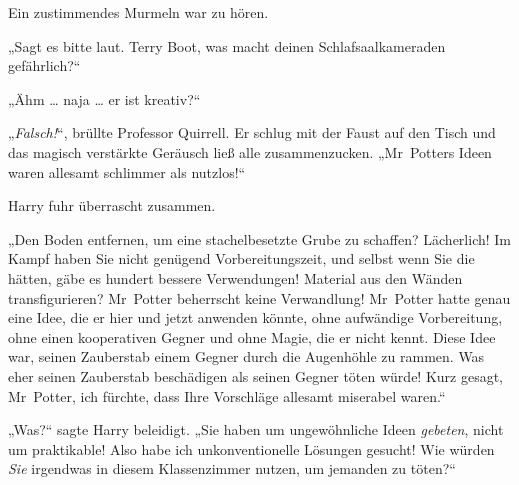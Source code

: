 Ein zustimmendes Murmeln war zu hören.

„Sagt es bitte laut. Terry Boot, was macht deinen Schlafsaalkameraden gefährlich?“

„Ähm … naja … er ist kreativ?“

„\emph{Falsch!}“, brüllte Professor Quirrell. Er schlug mit der Faust auf den Tisch und das magisch verstärkte Geräusch ließ alle zusammenzucken.
„Mr~Potters Ideen waren allesamt schlimmer als nutzlos!“

Harry fuhr überrascht zusammen.

„Den Boden entfernen, um eine stachelbesetzte Grube zu schaffen? Lächerlich! Im Kampf haben Sie nicht genügend Vorbereitungszeit, und selbst wenn Sie die hätten, gäbe es hundert bessere Verwendungen! Material aus den Wänden transfigurieren? Mr~Potter beherrscht keine Verwandlung! Mr~Potter hatte genau eine Idee, die er hier und jetzt anwenden könnte, ohne aufwändige Vorbereitung, ohne einen kooperativen Gegner und ohne Magie, die er nicht kennt. Diese Idee war, seinen Zauberstab einem Gegner durch die Augenhöhle zu rammen. Was eher seinen Zauberstab beschädigen als seinen Gegner töten würde! Kurz gesagt, Mr~Potter, ich fürchte, dass Ihre Vorschläge allesamt miserabel waren.“

„Was?“ sagte Harry beleidigt.
„Sie haben um ungewöhnliche Ideen \emph{gebeten}, nicht um praktikable! Also habe ich unkonventionelle Lösungen gesucht! Wie würden \emph{Sie} irgendwas in diesem Klassenzimmer nutzen, um jemanden zu töten?“

